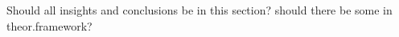 \label{result:interviews}
Should all insights and conclusions be in this section? should there be some in theor.framework?
